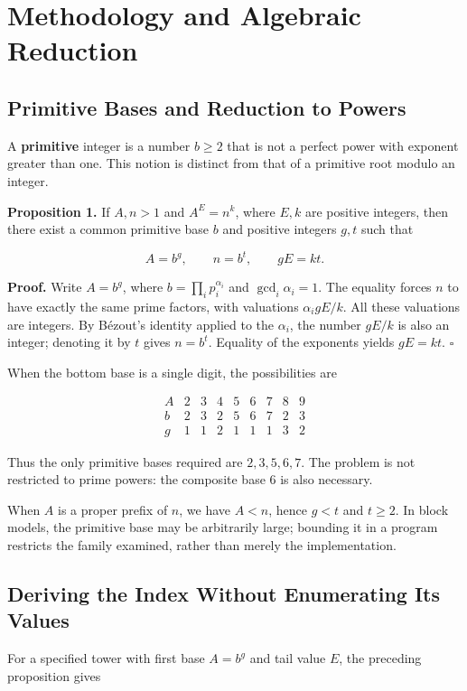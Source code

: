 \documentclass[11pt,a4paper]{article}
\begin{document}
\section{Methodology and Algebraic Reduction}

\subsection{Primitive Bases and Reduction to Powers}

A \textbf{primitive} integer is a number $b\geq2$ that is not a perfect power with exponent greater than one. This notion is distinct from that of a primitive root modulo an integer.

\textbf{Proposition 1.} If $A,n>1$ and $A^E=n^k$, where $E,k$ are positive integers, then there exist a common primitive base $b$ and positive integers $g,t$ such that

\[
A=b^g,\qquad n=b^t,\qquad gE=kt.
\]

\textbf{Proof.} Write $A=b^g$, where $b=\prod_i p_i^{\alpha_i}$ and $\gcd_i\alpha_i=1$. The equality forces $n$ to have exactly the same prime factors, with valuations $\alpha_i gE/k$. All these valuations are integers. By Bézout's identity applied to the $\alpha_i$, the number $gE/k$ is also an integer; denoting it by $t$ gives $n=b^t$. Equality of the exponents yields $gE=kt$. $\square$

When the bottom base is a single digit, the possibilities are

\[
\begin{array}{c|rrrrrrrr}
A&2&3&4&5&6&7&8&9\\\hline
b&2&3&2&5&6&7&2&3\\
g&1&1&2&1&1&1&3&2
\end{array}
\]

Thus the only primitive bases required are $2,3,5,6,7$. The problem is not restricted to prime powers: the composite base $6$ is also necessary.

When $A$ is a proper prefix of $n$, we have $A<n$, hence $g<t$ and $t\geq2$. In block models, the primitive base may be arbitrarily large; bounding it in a program restricts the family examined, rather than merely the implementation.

\subsection{Deriving the Index Without Enumerating Its Values}

For a specified tower with first base $A=b^g$ and tail value $E$, the preceding proposition gives
\end{document}
